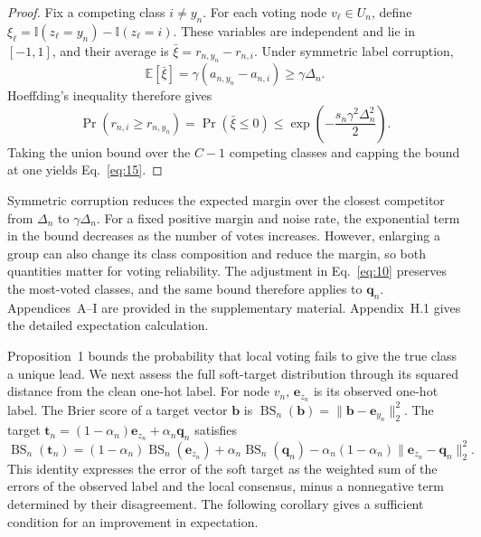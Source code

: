 \documentclass[times,review,10pt]{elsarticle}
\theoremstyle{definition}
\theoremstyle{plain}
\begin{document}
\begin{proof}
\renewcommand{\qedsymbol}{}
Fix a competing class \(i\ne y_n\). For each voting node \(v_\ell\in U_n\), define \(\xi_\ell=\mathbb I(z_\ell=y_n)-\mathbb I(z_\ell=i)\). These variables are independent and lie in \([-1,1]\), and their average is \(\bar\xi=r_{n,y_n}-r_{n,i}\). Under symmetric label corruption,
\[
\mathbb E[\bar\xi]=\gamma(a_{n,y_n}-a_{n,i})\geq\gamma\Delta_n.
\]
Hoeffding's inequality \cite{hoeffding1963} therefore gives
\[
\Pr\!\left(r_{n,i}\geq r_{n,y_n}\right)=\Pr(\bar\xi\leq0)
\leq\exp\!\left(-\frac{s_n\gamma^2\Delta_n^2}{2}\right).
\]
Taking the union bound over the \(C-1\) competing classes and capping the bound at one yields Eq.~\eqref{eq:15}.
\end{proof}

Symmetric corruption reduces the expected margin over the closest competitor from \(\Delta_n\) to \(\gamma\Delta_n\). For a fixed positive margin and noise rate, the exponential term in the bound decreases as the number of votes increases. However, enlarging a group can also change its class composition and reduce the margin, so both quantities matter for voting reliability. The adjustment in Eq.~\eqref{eq:10} preserves the most-voted classes, and the same bound therefore applies to \(\mathbf q_n\). Appendices~A--I are provided in the supplementary material. Appendix~H.1 gives the detailed expectation calculation.

Proposition~1 bounds the probability that local voting fails to give the true class a unique lead. We next assess the full soft-target distribution through its squared distance from the clean one-hot label. For node \(v_n\), \(\mathbf e_{z_n}\) is its observed one-hot label. The Brier score of a target vector \(\mathbf b\) is \(\operatorname{BS}_n(\mathbf b)=\|\mathbf b-\mathbf e_{y_n}\|_2^2\). The target \(\mathbf t_n=(1-\alpha_n)\mathbf e_{z_n}+\alpha_n\mathbf q_n\) satisfies
\begin{equation}\label{eq:16}
\operatorname{BS}_n(\mathbf t_n)=(1-\alpha_n)\operatorname{BS}_n(\mathbf e_{z_n})+\alpha_n\operatorname{BS}_n(\mathbf q_n)-\alpha_n(1-\alpha_n)\|\mathbf e_{z_n}-\mathbf q_n\|_2^2.
\end{equation}
This identity expresses the error of the soft target as the weighted sum of the errors of the observed label and the local consensus, minus a nonnegative term determined by their disagreement. The following corollary gives a sufficient condition for an improvement in expectation.
\end{document}

